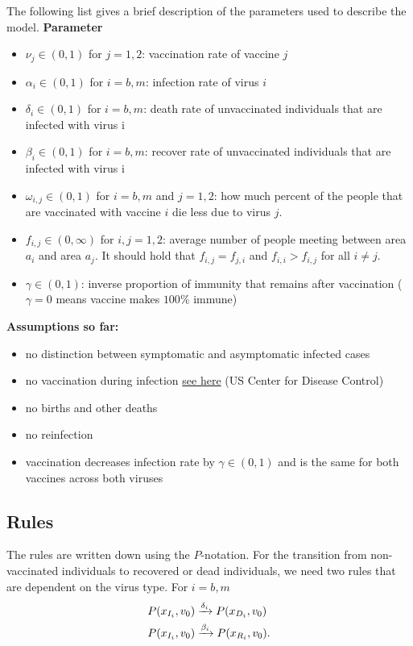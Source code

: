 The following list gives a brief description of the parameters used to describe the model. 
\vspace{0.5cm}
\textbf{Parameter}
\begin{itemize}
    \item $\nu_j \in (0,1)$ for $j=1,2$: vaccination rate of vaccine $j$
    \item $\alpha_i \in (0,1)$ for $i=b,m$: infection rate of virus $i$
    \item $\delta_i \in (0,1)$  for $i=b,m$: death rate of unvaccinated individuals that are infected with virus i
    \item $\beta_i \in (0,1)$ for $i=b,m$: recover rate of unvaccinated individuals that are infected with virus i
    \item $\omega_{i,j} \in (0,1)$ for $i=b,m$ and $j=1,2$: how much percent of the people that are vaccinated with vaccine $i$ die less due to virus $j$. 
    \item $f_{i,j} \in (0,\infty)$ for $i,j=1,2$: average number of people meeting between area $a_i$ and area $a_j$. It should hold that $f_{i,j} = f_{j,i}$ and $f_{i,i} > f_{i,j}$ for all $i \neq j$.
    \item $\gamma \in (0,1)$: inverse proportion of immunity that remains after vaccination ($\gamma =0$ means vaccine makes $100\%$ immune)
\end{itemize}
\vspace{0.5cm}


\textbf{Assumptions so far:} 
\begin{itemize}
    \item no distinction between symptomatic and asymptomatic infected cases
    \item no vaccination during infection \href{https://www.cdc.gov/vaccines/covid-19/info-by-product/clinical-considerations.html}{see here} (US Center for Disease Control)
    \item no births and other deaths
    \item no reinfection
    \item vaccination decreases infection rate by $\gamma \in (0,1)$ and is the same for both vaccines across both viruses
\end{itemize}
\vspace{0.5cm}

\subsection{Rules}
The rules are written down using the $P$-notation. For the transition from non-vaccinated individuals to recovered or dead individuals, we need two rules that are dependent on the virus type. For $i = b,m$
\begin{align}
    P(x_{I_i},  v_0) &\xrightarrow{\delta_i} P(x_{D_i}, v_0) \\
    P(x_{I_i},  v_0) &\xrightarrow{\beta_i} P(x_{R_i},  v_0).\notag
\end{align}

